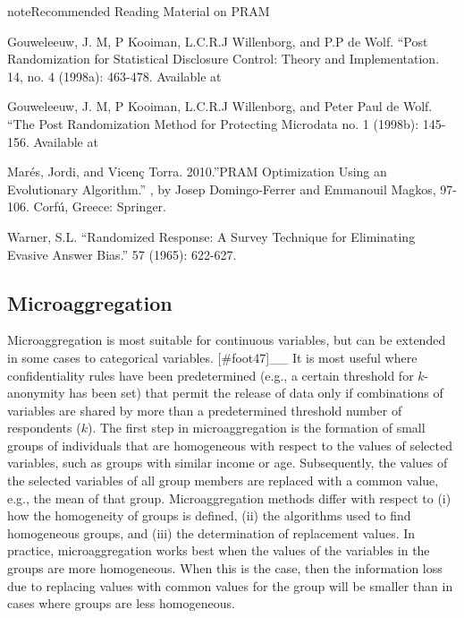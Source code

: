 \documentclass[letterpaper,10pt,english]{sphinxmanual}
\begin{document}
\begin{sphinxadmonition}{note}{Recommended Reading Material on PRAM}

Gouweleeuw, J. M, P Kooiman, L.C.R.J Willenborg, and P.P de Wolf. “Post
Randomization for Statistical Disclosure Control: Theory and
Implementation. 14, no. 4 (1998a):
463-478. Available at

Gouweleeuw, J. M, P Kooiman, L.C.R.J Willenborg, and Peter Paul de Wolf.
“The Post Randomization Method for Protecting Microdata no. 1 (1998b):
145-156. Available at

Marés, Jordi, and Vicenç Torra. 2010.”PRAM Optimization Using an
Evolutionary Algorithm.” , by Josep
Domingo-Ferrer and Emmanouil Magkos, 97-106. Corfú, Greece: Springer.

Warner, S.L. “Randomized Response: A Survey Technique for Eliminating
Evasive Answer Bias.”  57
(1965): 622-627.
\end{sphinxadmonition}


\subsection{Microaggregation}
\label{\detokenize{anon_methods:id12}}
Microaggregation is most suitable for continuous variables, but can be
extended in some cases to categorical variables. {[}\#foot47{]}\_\_
It is most useful where confidentiality rules have been predetermined
(e.g., a certain threshold for \(k\)-anonymity has been set) that
permit the release of data only if combinations of variables are shared
by more than a predetermined threshold number of respondents
(\(k\)). The first step in microaggregation is the formation of
small groups of individuals that are homogeneous with respect to the
values of selected variables, such as groups with similar income or age.
Subsequently, the values of the selected variables of all group members
are replaced with a common value, e.g., the mean of that group.
Microaggregation methods differ with respect to (i) how the homogeneity
of groups is defined, (ii) the algorithms used to find homogeneous
groups, and (iii) the determination of replacement values. In practice,
microaggregation works best when the values of the variables in the
groups are more homogeneous. When this is the case, then the information
loss due to replacing values with common values for the group will be
smaller than in cases where groups are less homogeneous.
\end{document}
